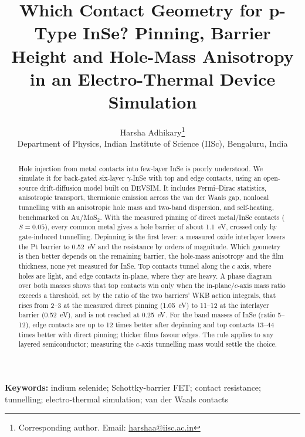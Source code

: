\documentclass[11pt]{article}
\title{Which Contact Geometry for p-Type InSe? Pinning, Barrier Height and Hole-Mass Anisotropy in an Electro-Thermal Device Simulation}
\author{Harsha Adhikary\thanks{Corresponding author. Email: \href{mailto:harshaa@iisc.ac.in}{harshaa@iisc.ac.in}} \\[4pt]
\small Department of Physics, Indian Institute of Science (IISc), Bengaluru, India}
\date{}
\begin{document}
\maketitle

\begin{abstract}
\noindent
Hole injection from metal contacts into few-layer InSe is poorly understood. We simulate it for back-gated six-layer $\gamma$-InSe with top and edge contacts, using an open-source drift-diffusion model built on DEVSIM. It includes Fermi--Dirac statistics, anisotropic transport, thermionic emission across the van der Waals gap, nonlocal tunnelling with an anisotropic hole mass and two-band dispersion, and self-heating, benchmarked on Au/MoS$_2$. With the measured pinning of direct metal/InSe contacts ($S=0.05$), every common metal gives a hole barrier of about 1.1~eV, crossed only by gate-induced tunnelling. Depinning is the first lever: a measured oxide interlayer lowers the Pt barrier to 0.52~eV and the resistance by orders of magnitude. Which geometry is then better depends on the remaining barrier, the hole-mass anisotropy and the film thickness, none yet measured for InSe. Top contacts tunnel along the $c$ axis, where holes are light, and edge contacts in-plane, where they are heavy. A phase diagram over both masses shows that top contacts win only when the in-plane/$c$-axis mass ratio exceeds a threshold, set by the ratio of the two barriers' WKB action integrals, that rises from 2--3 at the measured direct pinning (1.05~eV) to 11--12 at the interlayer barrier (0.52~eV), and is not reached at 0.25~eV. For the band masses of InSe (ratio 5--12), edge contacts are up to 12 times better after depinning and top contacts 13--44 times better with direct pinning; thicker films favour edges. The rule applies to any layered semiconductor; measuring the $c$-axis tunnelling mass would settle the choice.
\end{abstract}

\noindent\textbf{Keywords:} indium selenide; Schottky-barrier FET; contact resistance; tunnelling; electro-thermal simulation; van der Waals contacts

\linenumbers
\end{document}
